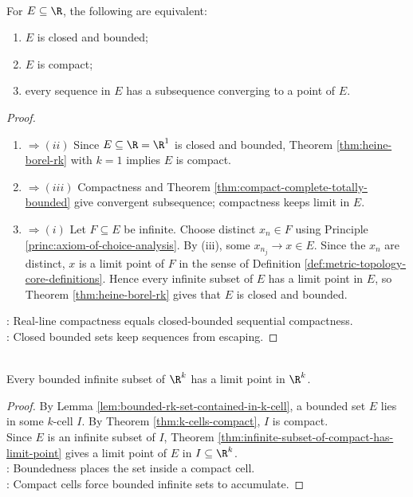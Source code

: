 \begin{corollary} \label{cor:heine-borel-real-line-sequential-form} \\
For $E\subseteq\R$, the following are equivalent:
\begin{enumerate}[label=(\roman*)]
\setlength{\itemsep}{0pt}
\item $E$ is closed and bounded;
\item $E$ is compact;
\item every sequence in $E$ has a subsequence converging to a point of $E$.
\end{enumerate}
\begin{proof}
\begin{enumerate}[label=(\roman*).]
\setlength{\itemsep}{0pt}
\item[$(i)$]$\Rightarrow (ii)$ Since $E\subseteq\R=\R^1$ is closed and bounded, Theorem \ref{thm:heine-borel-rk} with $k=1$ implies $E$ is compact.
\item[$(ii)$]$\Rightarrow (iii)$ Compactness and Theorem \ref{thm:compact-complete-totally-bounded} give convergent subsequence; compactness keeps limit in $E$.
\item[$(iii)$]$\Rightarrow (i)$ Let $F\subseteq E$ be infinite. Choose distinct $x_n\in F$ using Principle \ref{princ:axiom-of-choice-analysis}. By (iii), some $x_{n_j}\to x\in E$. Since the $x_n$ are distinct, $x$ is a limit point of $F$ in the sense of Definition \ref{def:metric-topology-core-definitions}. Hence every infinite subset of $E$ has a limit point in $E$, so Theorem \ref{thm:heine-borel-rk} gives that $E$ is closed and bounded.
\end{enumerate}
: Real-line compactness equals closed-bounded sequential compactness.\\
: Closed bounded sets keep sequences from escaping.
\end{proof}
\end{corollary}

\begin{theorem} \label{thm:weierstrass-limit-point-rk} \\
Every bounded infinite subset of $\R^k$ has a limit point in $\R^k$.
\begin{proof}
By Lemma \ref{lem:bounded-rk-set-contained-in-k-cell}, a bounded set $E$ lies in some $k$-cell $I$. By Theorem \ref{thm:k-cells-compact}, $I$ is compact.\\
Since $E$ is an infinite subset of $I$, Theorem \ref{thm:infinite-subset-of-compact-has-limit-point} gives a limit point of $E$ in $I\subseteq\R^k$.\\
: Boundedness places the set inside a compact cell.\\
: Compact cells force bounded infinite sets to accumulate.
\end{proof}
\end{theorem}
